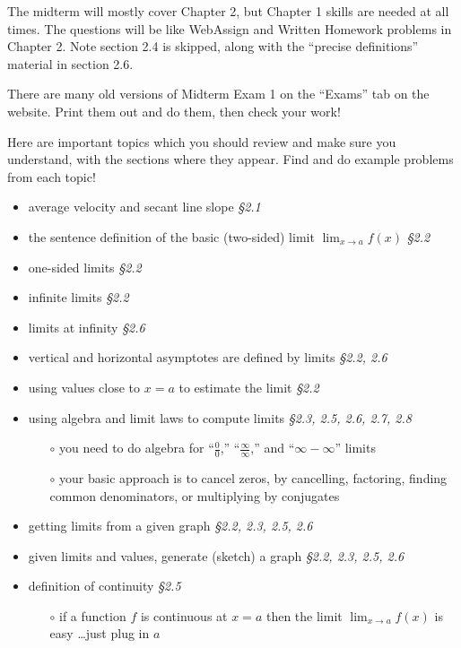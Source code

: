 \documentclass[12pt]{article}
\begin{document}
\renewcommand{\d}{\displaystyle}

The midterm will mostly cover Chapter 2, but Chapter 1 skills are needed at all times.  The questions will be like WebAssign and Written Homework problems in Chapter 2.  Note section 2.4 is skipped, along with the ``precise definitions'' material in section 2.6.

\medskip
There are many old versions of Midterm Exam 1 on the ``Exams'' tab on the website.  Print them out and do them, then check your work!

\medskip
Here are important topics which you should review and make sure you understand, with the sections where they appear.  Find and do example problems from each topic!
\begin{itemize}
\setlength\itemsep{1pt}
\item average velocity and secant line slope \hfill \emph{\S 2.1}
\item the sentence definition of the basic (two-sided) limit $\lim_{x\to a} f(x)$ \hfill\emph{\S 2.2}
\item one-sided limits  \hfill \emph{\S 2.2}
\item infinite limits  \hfill \emph{\S 2.2}
\item limits at infinity  \hfill \emph{\S 2.6}
\item vertical and horizontal asymptotes are defined by limits  \hfill \emph{\S 2.2, 2.6}
\item using values close to $x=a$ to estimate the limit  \hfill \emph{\S 2.2}
\item using algebra and limit laws to compute limits  \hfill \emph{\S 2.3, 2.5, 2.6, 2.7, 2.8}
    \begin{itemize}
    \item[$\circ$] you need to do algebra for ``$\frac{0}{0}$,'' ``$\frac{\infty}{\infty}$,'' and ``$\infty - \infty$'' limits
    \item[$\circ$] your basic approach is to cancel zeros, by cancelling, factoring, finding common denominators, or multiplying by conjugates
    \end{itemize}
\item getting limits from a given graph  \hfill \emph{\S 2.2, 2.3, 2.5, 2.6}
\item given limits and values, generate (sketch) a graph  \hfill \emph{\S 2.2, 2.3, 2.5, 2.6}
\item definition of continuity  \hfill \emph{\S 2.5}
    \begin{itemize}
    \item[$\circ$] if a function $f$ is continuous at $x=a$ then the limit $\lim_{x\to a} f(x)$ is easy \dots just plug in $a$

\end{itemize}
\end{itemize}
\end{document}
